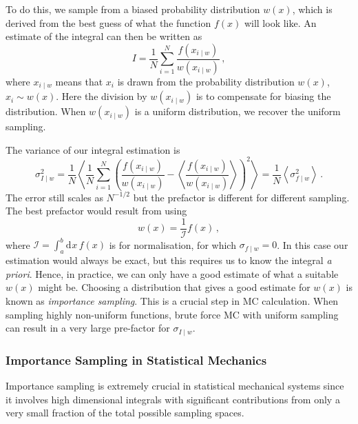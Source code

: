 \documentclass{article}
\theoremstyle{plain}\theoremheaderfont{\normalfont\itshape}\theorembodyfont{\rmfamily}\theoremseparator{.}\newtheorem*{rem}{Remark}\newtheorem*{ex}{Example}\newtheorem*{proof}{Proof}\newtheorem*{altp}{Alternative proof}
\theoremstyle{plain}\theoremheaderfont{\normalfont\bfseries}\theorembodyfont{\rmfamily}\theoremseparator{.}\newtheorem{thm}{Theorem}[section]\newtheorem{lem}[thm]{Lemma}\newtheorem{prop}[thm]{Proposition}\newtheorem*{cor}{Corollary}\newtheorem{defn}[thm]{Definition}\newtheorem{clm}[thm]{Claim}\newtheorem{clminproof}{Claim}\newtheorem{alg}[thm]{Algorithm}\newtheorem{hyp}[thm]{Hypothesis}\newtheorem{law}[thm]{Law}
\theoremstyle{break}\theoremheaderfont{\normalfont\itshape}\theorembodyfont{\rmfamily}\theoremseparator{.\medskip}\newtheorem*{proofskip}{Proof}\newtheorem*{exs}{Examples}\newtheorem*{rems}{Remarks}
\theoremstyle{break}\theoremheaderfont{\normalfont\bfseries}\theorembodyfont{\rmfamily}\theoremseparator{.\medskip}\newtheorem{lemskip}[thm]{Lemma}\newtheorem{defnskip}[thm]{Definition}\newtheorem{propskip}[thm]{Proposition}\newtheorem{thmskip}[thm]{Theorem}
\numberwithin{equation}{section}
\newcommand{\dd}[2][]{\mathrm{d}^{#1} #2\,}
\newcommand{\eval}[1]{\left\langle #1 \right\rangle}
\begin{document}
    To do this, we sample from a biased probability distribution \(w(x)\), which is derived from the best guess of what the function \(f(x)\) will look like. An estimate of the integral can then be written as
    \begin{equation}
        I=\frac{1}{N}\sum_{i=1}^{N}\frac{f(x_{i\mid w})}{w(x_{i\mid w})}\,,
    \end{equation}
    where \(x_{i\mid w}\) means that \(x_i\) is drawn from the probability distribution \(w(x)\), \(x_{i}\sim w(x)\). Here the division by \(w(x_{i\mid w})\) is to compensate for biasing the distribution. When \(w(x_{i\mid w})\) is a uniform distribution, we recover the uniform sampling.

    The variance of our integral estimation is
    \begin{equation}
        \sigma_{I\mid w}^2=\frac{1}{N}\eval{\frac{1}{N}\sum_{i=1}^{N}\left(\frac{f(x_{i\mid w})}{w(x_{i\mid w})}-\eval{\frac{f(x_{i\mid w})}{w(x_{i\mid w})}}\right)^2}=\frac{1}{N}\eval{\sigma_{f\mid w}^2}\,.
    \end{equation}
    The error still scales as \(N^{-1/2}\) but the prefactor is different for different sampling. The best prefactor would result from using
    \begin{equation}
        w(x)=\frac{1}{\mathcal{I}}f(x)\,,
    \end{equation}
    where \(\mathcal{I}=\int_{a}^{b}\dd{x}f(x)\) is for normalisation, for which \(\sigma_{f\mid w}=0\). In this case our estimation would always be exact, but this requires us to know the integral \textit{a priori}. Hence, in practice, we can only have a good estimate of what a suitable \(w(x)\) might be. Choosing a distribution that gives a good estimate for \(w(x)\) is known as \textit{importance sampling}. This is a crucial step in MC calculation. When sampling highly non-uniform functions, brute force MC with uniform sampling can result in a very large pre-factor for \(\sigma_{I\mid w}\).

    \subsubsection{Importance Sampling in Statistical Mechanics}
    Importance sampling is extremely crucial in statistical mechanical systems since it involves high dimensional integrals with significant contributions from only a very small fraction of the total possible sampling spaces.
\end{document}
